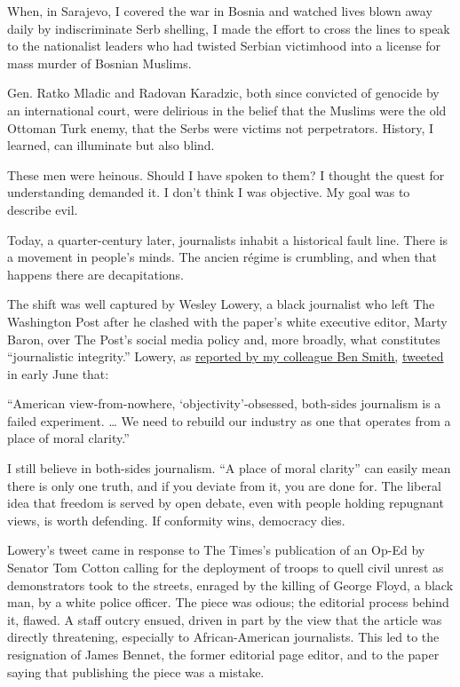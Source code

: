 When, in Sarajevo, I covered the war in Bosnia and watched lives blown
away daily by indiscriminate Serb shelling, I made the effort to cross
the lines to speak to the nationalist leaders who had twisted Serbian
victimhood into a license for mass murder of Bosnian Muslims.

Gen. Ratko Mladic and Radovan Karadzic, both since convicted of genocide
by an international court, were delirious in the belief that the Muslims
were the old Ottoman Turk enemy, that the Serbs were victims not
perpetrators. History, I learned, can illuminate but also blind.

These men were heinous. Should I have spoken to them? I thought the
quest for understanding demanded it. I don't think I was objective. My
goal was to describe evil.

Today, a quarter-century later, journalists inhabit a historical fault
line. There is a movement in people's minds. The ancien régime is
crumbling, and when that happens there are decapitations.

The shift was well captured by Wesley Lowery, a black journalist who
left The Washington Post after he clashed with the paper's white
executive editor, Marty Baron, over The Post's social media policy and,
more broadly, what constitutes ``journalistic integrity.'' Lowery, as
\href{https://www.nytimes.com/2020/06/07/business/media/new-york-times-washington-post-protests.html}{reported
by my colleague Ben Smith,}
\href{https://twitter.com/WesleyLowery/status/1268366363359354885}{tweeted}
in early June that:

``American view-from-nowhere, `objectivity'-obsessed, both-sides
journalism is a failed experiment. \ldots{} We need to rebuild our
industry as one that operates from a place of moral clarity.''

I still believe in both-sides journalism. ``A place of moral clarity''
can easily mean there is only one truth, and if you deviate from it, you
are done for. The liberal idea that freedom is served by open debate,
even with people holding repugnant views, is worth defending. If
conformity wins, democracy dies.

Lowery's tweet came in response to The Times's publication of an Op-Ed
by Senator Tom Cotton calling for the deployment of troops to quell
civil unrest as demonstrators took to the streets, enraged by the
killing of George Floyd, a black man, by a white police officer. The
piece was odious; the editorial process behind it, flawed. A staff
outcry ensued, driven in part by the view that the article was directly
threatening, especially to African-American journalists. This led to the
resignation of James Bennet, the former editorial page editor, and to
the paper saying that publishing the piece was a mistake.

